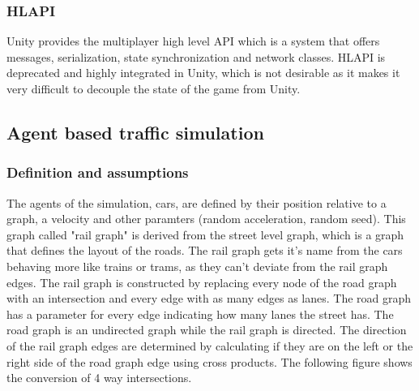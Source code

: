 \documentclass[12pt]{article}
\begin{document}
\subsubsection{HLAPI \cite{hlapi}}
Unity provides the multiplayer high level API which is a system that offers messages, serialization, state synchronization and network classes. HLAPI is deprecated and highly integrated in Unity, which is not desirable as it makes it very difficult to decouple the state of the game from Unity.

\clearpage

\subsection{Agent based traffic simulation}

\subsubsection{Definition and assumptions}
The agents of the simulation, cars, are defined by their position relative to a graph, a velocity and other paramters (random acceleration, random seed). This graph called "rail graph" is derived from the street level graph, which is a graph that defines the layout of the roads. The rail graph gets it's name from the cars behaving more like trains or trams, as they can't deviate from the rail graph edges. The rail graph is constructed by replacing every node of the road graph with an intersection and every edge with as many edges as lanes. The road graph has a parameter for every edge indicating how many lanes the street has. The road graph is an undirected graph while the rail graph is directed. The direction of the rail graph edges are determined by calculating if they are on the left or the right side of the road graph edge using cross products. The following figure shows the conversion of 4 way intersections. 
\end{document}

